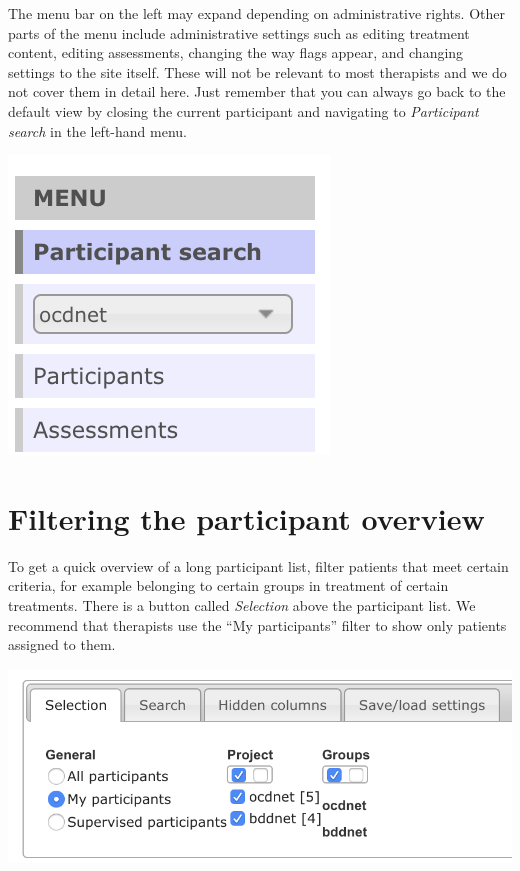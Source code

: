 \documentclass[]{book}
\theoremstyle{definition}
\theoremstyle{definition}
\theoremstyle{definition}
\theoremstyle{remark}
\begin{document}
The menu bar on the left may expand depending on administrative rights.
Other parts of the menu include administrative settings such as editing
treatment content, editing assessments, changing the way flags appear,
and changing settings to the site itself. These will not be relevant to
most therapists and we do not cover them in detail here. Just remember
that you can always go back to the default view by closing the current
participant and navigating to \emph{Participant search} in the left-hand
menu.

\includegraphics{images/therapist-menu.png}

\hypertarget{filtering-the-participant-overview}{%
\section{Filtering the participant
overview}\label{filtering-the-participant-overview}}

To get a quick overview of a long participant list, filter patients that
meet certain criteria, for example belonging to certain groups in
treatment of certain treatments. There is a button called
\emph{Selection} above the participant list. We recommend that
therapists use the ``My participants'' filter to show only patients
assigned to them.

\includegraphics{images/filter-participants.png}
\end{document}
